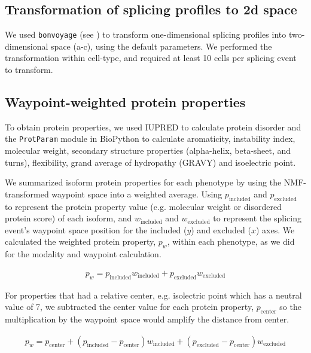 \subsection{Transformation of splicing profiles to 2d space}

We used \texttt{bonvoyage} (see ) to transform one-dimensional splicing profiles into two-dimensional space (a-c), using the default parameters. We performed the transformation within cell-type, and required at least 10 cells per splicing event to transform.

\subsection{Waypoint-weighted protein properties}

To obtain protein properties, we used IUPRED \cite{Dosztanyi:2005gq} to calculate protein disorder and the \texttt{ProtParam} module in BioPython \cite{Cock:2009hj} to calculate aromaticity, instability index, molecular weight, secondary structure properties (alpha-helix, beta-sheet, and turns), flexibility, grand average of hydropathy (GRAVY) and isoelectric point.



We summarized isoform protein properties for each phenotype by using the NMF-transformed waypoint space into a weighted average. Using $p_{\text{included}}$ and $p_{\text{excluded}}$ to represent the protein property value (e.g. molecular weight or disordered protein score) of each isoform, and $w_{\text{included}}$ and $w_{\text{excluded}}$ to represent the splicing event's waypoint space position for the included ($y$) and excluded ($x$) axes. We calculated the weighted protein property, $p_w$, within each phenotype, as we did for the modality and waypoint calculation.

\begin{align}
p_w = p_{\text{included}} w_{\text{included}} + p_{\text{excluded}} w_{\text{excluded}}
\end{align}

For properties that had a relative center, e.g. isolectric point which has a neutral value of 7, we subtracted the center value for each protein property, $p_{\text{center}}$ so the multiplication by the waypoint space would amplify the distance from center.

\begin{align}
p_w = p_{\text{center}} + (p_{\text{included}} - p_{\text{center}}) w_{\text{included}} + (p_{\text{excluded}} - p_{\text{center}}) w_{\text{excluded}}
\end{align}

